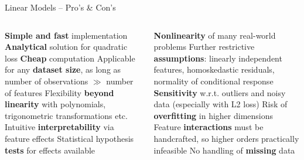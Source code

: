 \begin{frame}{Linear Models -- Pro's \& Con's}



\begin{columns}[onlytextwidth]
  \begin{column}{0.5\textwidth}
    
    \begin{itemize}
      \positem \textbf{Simple and fast} implementation
      \positem \textbf{Analytical} solution for quadratic loss
      \positem \textbf{Cheap} computation
      \positem Applicable for any \textbf{dataset size}, as long as number of 
      observations $\gg$ number of features
      \positem Flexibility \textbf{beyond linearity} with polynomials, 
      trigonometric transformations etc.
      \positem Intuitive \textbf{interpretability} via feature effects
      \positem Statistical hypothesis \textbf{tests} for effects available

    \end{itemize}
  \end{column}

  \begin{column}{0.5\textwidth}
    
    \begin{itemize}
      \negitem \textbf{Nonlinearity} of many real-world problems
      \negitem Further restrictive \textbf{assumptions}: linearly independent 
      features, homoskedastic residuals, normality of conditional response
      \negitem \textbf{Sensitivity} w.r.t. outliers and noisy data (especially 
      with L2 loss)
      \negitem Risk of \textbf{overfitting} in higher dimensions
      \negitem Feature \textbf{interactions} must be handcrafted, so higher
      orders practically infeasible
      \negitem No handling of \textbf{missing} data
    \end{itemize}
  \end{column}
\end{columns}

\vfill

\small


\end{frame}


